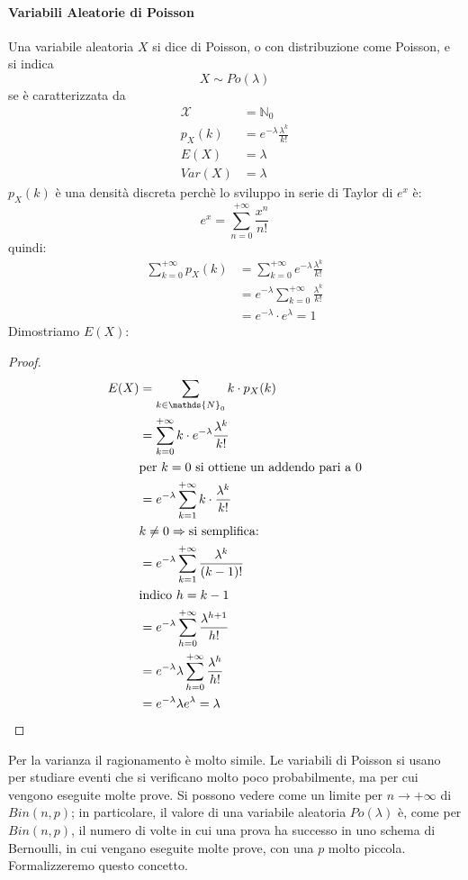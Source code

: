 \documentclass{article}
\theoremstyle{plain}
\theoremstyle{definition}
\theoremstyle{remark}
\begin{document}
\paragraph{Variabili Aleatorie di Poisson} %
\label{par:variabili_aleatorie_di_poisson}
Una variabile aleatoria $X$ si dice di Poisson, o con distribuzione come Poisson, e si indica
\begin{equation*}
	X\sim Po(\lambda)
\end{equation*}
se è caratterizzata da
\begin{align*}
	\mathcal{X}&=\mathds{N}_0\\
	p_X(k)&=e^{-\lambda}\frac{\lambda^k}{k!}\\
	E(X)&=\lambda\\
	Var(X)&=\lambda
\end{align*}
$p_X(k)$ è una densità discreta perchè lo sviluppo in serie di Taylor di $e^x$ è:
\begin{equation*}
	e^x=\sum_{n=0}^{+\infty}\frac{x^n}{n!}
\end{equation*}
quindi:
\begin{align*}
	\sum_{k=0}^{+\infty}p_X(k)&=\sum_{k=0}^{+\infty}e^{-\lambda}\frac{\lambda^k}{k!}\\
	&=e^{-\lambda}\sum_{k=0}^{+\infty}\frac{\lambda^k}{k!}\\
	&=e^{-\lambda}\cdot e^{\lambda}=1
\end{align*}
Dimostriamo $E(X)$:
\begin{proof}
	\begin{align*}
		E(X)&=\sum_{k\in\mathds{N}_0}k\cdot p_X(k)\\
		&=\sum_{k=0}^{+\infty}k\cdot e^{-\lambda}\frac{\lambda^k}{k!}\\
		&\text{per }k=0\text{ si ottiene un addendo pari a }0\\
		&=e^{-\lambda}\sum_{k=1}^{+\infty}k\cdot\frac{\lambda^k}{k!}\\
		&k\neq0\Rightarrow\text{si semplifica:}\\
		&=e^{-\lambda}\sum_{k=1}^{+\infty}\frac{\lambda^k}{(k-1)!}\\
		&\text{indico }h=k-1\\
		&=e^{-\lambda}\sum_{h=0}^{+\infty}\frac{\lambda^{h+1}}{h!}\\
		&=e^{-\lambda}\lambda\sum_{h=0}^{+\infty}\frac{\lambda^h}{h!}\\
		&=e^{-\lambda}\lambda e^{\lambda}=\lambda\qedhere
	\end{align*}
\end{proof}
Per la varianza il ragionamento è molto simile. Le variabili di Poisson si usano per studiare eventi che si verificano molto poco probabilmente, ma per cui vengono eseguite molte prove. Si possono vedere come un limite per $n\to+\infty$ di $Bin(n,p)$; in particolare, il valore di una variabile aleatoria $Po(\lambda)$ è, come per $Bin(n,p)$, il numero di volte in cui una prova ha successo in uno schema di Bernoulli, in cui vengano eseguite molte prove, con una $p$ molto piccola. Formalizzeremo questo concetto.
\end{document}
